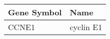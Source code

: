 \begin{tabular}{ll}
\toprule
Gene Symbol &      Name \\
\midrule
      CCNE1 & cyclin E1 \\
\bottomrule
\end{tabular}
